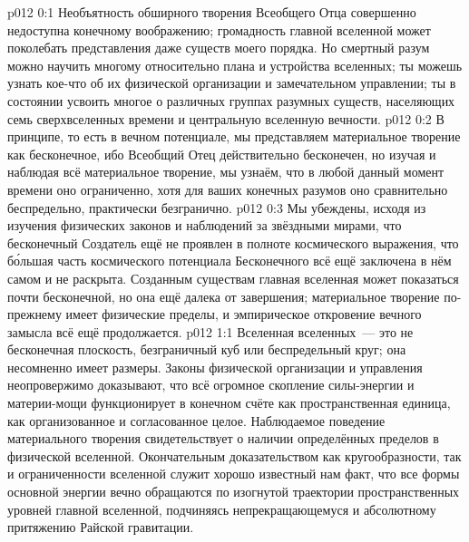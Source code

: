 \author{Совершенствователь Мудрости}
\vs p012 0:1 Необъятность обширного творения Всеобщего Отца совершенно недоступна конечному воображению; громадность главной вселенной может поколебать представления даже существ моего порядка. Но смертный разум можно научить многому относительно плана и устройства вселенных; ты можешь узнать кое\hyp{}что об их физической организации и замечательном управлении; ты в состоянии усвоить многое о различных группах разумных существ, населяющих семь сверхвселенных времени и центральную вселенную вечности.
\vs p012 0:2 В принципе, то есть в вечном потенциале, мы представляем материальное творение как бесконечное, ибо Всеобщий Отец действительно бесконечен, но изучая и наблюдая всё материальное творение, мы узнаём, что в любой данный момент времени оно ограниченно, хотя для ваших конечных разумов оно сравнительно беспредельно, практически безгранично.
\vs p012 0:3 Мы убеждены, исходя из изучения физических законов и наблюдений за звёздными мирами, что бесконечный Создатель ещё не проявлен в полноте космического выражения, что б\'ольшая часть космического потенциала Бесконечного всё ещё заключена в нём самом и не раскрыта. Созданным существам главная вселенная может показаться почти бесконечной, но она ещё далека от завершения; материальное творение по\hyp{}прежнему имеет физические пределы, и эмпирическое откровение вечного замысла всё ещё продолжается.
\vs p012 1:1 Вселенная вселенных~--- это не бесконечная плоскость, безграничный куб или беспредельный круг; она несомненно имеет размеры. Законы физической организации и управления неопровержимо доказывают, что всё огромное скопление силы\hyp{}энергии и материи\hyp{}мощи функционирует в конечном счёте как пространственная единица, как организованное и согласованное целое. Наблюдаемое поведение материального творения свидетельствует о наличии определённых пределов в физической вселенной. Окончательным доказательством как кругообразности, так и ограниченности вселенной служит хорошо известный нам факт, что все формы основной энергии вечно обращаются по изогнутой траектории пространственных уровней главной вселенной, подчиняясь непрекращающемуся и абсолютному притяжению Райской гравитации.
